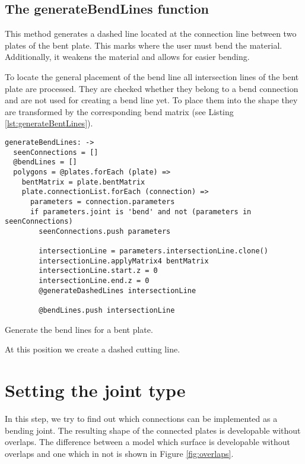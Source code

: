 \documentclass[../ClassicThesis.tex]{subfiles}
\begin{document}
\subsection{The generateBendLines function}
\label{sec:generateBendLines}

This method generates a dashed line located at the connection line between two plates of the bent plate. This marks where the user must bend the material. Additionally, it weakens the material and allows for easier bending.

To locate the general placement of the bend line all intersection lines of the bent plate are processed. They are checked whether they belong to a bend connection and are not used for creating a bend line yet. To place them into the shape they are transformed by the corresponding bend matrix (see Listing \ref{lst:generateBentLines}).

\begin{listing}[ht]
\begin{verbatim}
generateBendLines: ->
  seenConnections = []
  @bendLines = []
  polygons = @plates.forEach (plate) =>
    bentMatrix = plate.bentMatrix
    plate.connectionList.forEach (connection) =>
      parameters = connection.parameters
      if parameters.joint is 'bend' and not (parameters in seenConnections)
        seenConnections.push parameters

        intersectionLine = parameters.intersectionLine.clone()
        intersectionLine.applyMatrix4 bentMatrix
        intersectionLine.start.z = 0
        intersectionLine.end.z = 0
        @generateDashedLines intersectionLine

        @bendLines.push intersectionLine
\end{verbatim}
\caption{Generate the bend lines for a bent plate.}
\label{lst:bend-matrix}
\end{listing}

At this position we create a dashed cutting line.

\section{Setting the joint type}

In this step, we try to find out which connections can be implemented as a bending joint. The resulting shape of the connected plates is developable without overlaps. The difference between a model which surface is developable without overlaps and one which in not is shown in Figure \ref{fig:overlaps}.
\end{document}

